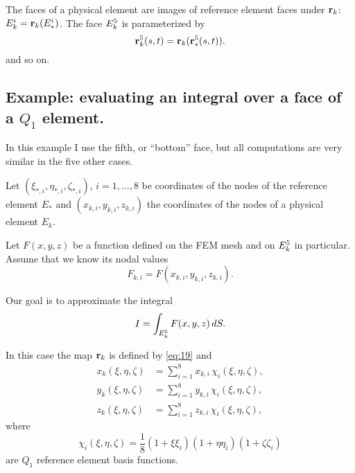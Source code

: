 \documentclass[11pt]{article}
\begin{document}
The faces of a physical element are images of reference element faces
under $\mathbf{r}_{k}$: $E_{k}^{i} = \mathbf{r}_{k}(E_{*}^{i})$. The face $E_{k}^{5}$ is
parameterized by
\begin{equation*}
\label{eq:21}
\mathbf{r}_{k}^{5}(s, t) = \mathbf{r}_{k}(\mathbf{r}_{*}^{5}(s,t)).
\end{equation*}
and so on.

\subsection{Example: evaluating an integral over a face of a $Q_{1}$ element.}
\label{sec-4-1}

\newcommand{\face}{\Fk{E}}

In this example I use the fifth, or ``bottom'' face, but all
computations are very similar in the five other cases.

Let $(\xi_{*,i}, \eta_{*,i}, \zeta_{*,i})$, $i = 1,\dots,8$ be coordinates
of the nodes of the reference element $E_{*}$ and $(x_{k,i}, y_{k,i},
z_{k,i})$ the coordinates of the nodes of a physical element $E_{k}$.

Let $F(x,y,z)$ be a function defined on the FEM mesh and on $\face$
in particular. Assume that we know its nodal values
\begin{equation*}
F_{k,i} = F(x_{k,i}, y_{k,i}, z_{k,i}).
\end{equation*}

Our goal is to approximate the integral
\begin{equation}
\label{eq:22}
I = \int_{\face} F(x,y,z)\, dS.
\end{equation}

In this case the map $\mathbf{r}_{k}$ is defined by \eqref{eq:19} and
\begin{equation}
\label{eq:23}
\begin{aligned}
x_{k}(\xi,\eta,\zeta) &= \sum_{i=1}^{8} x_{k,i}\, \chi_{i}(\xi, \eta, \zeta),\\
y_{k}(\xi,\eta,\zeta) &= \sum_{i=1}^{8} y_{k,i}\, \chi_{i}(\xi, \eta, \zeta),\\
z_{k}(\xi,\eta,\zeta) &= \sum_{i=1}^{8} z_{k,i}\, \chi_{i}(\xi, \eta, \zeta),
\end{aligned}
\end{equation}
where
\begin{equation}
\label{eq:24}
\chi_{i}(\xi,\eta,\zeta) = \frac18 (1 + \xi\xi_{i})(1 + \eta\eta_{i})(1 + \zeta\zeta_{i})
\end{equation}
are $Q_{1}$ reference element basis functions.
\end{document}
